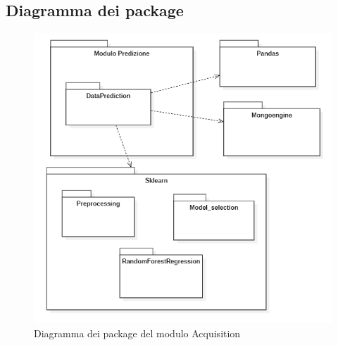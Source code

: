 \subsection{Diagramma dei package}
\begin{figure}[H]
  \begin{center}
    \includegraphics[scale=0.8]{../immagini/diag_PB/diag_pack_pred.png}
    \caption{Diagramma dei package del modulo Acquisition}
  \end{center}
\end{figure}

